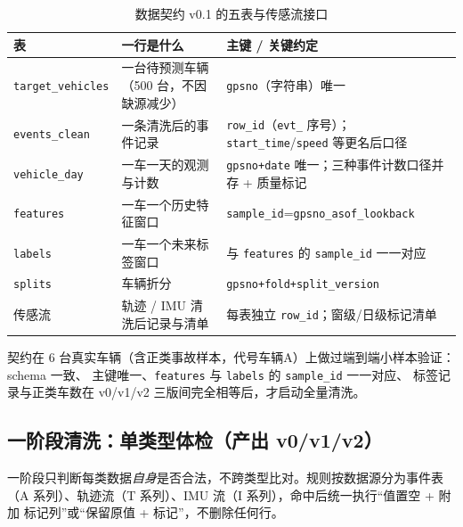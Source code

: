 \begin{table}[H]
\centering
\caption{数据契约 v0.1 的五表与传感流接口}
\label{tab:contract}
\small
\begin{tabularx}{\textwidth}{lLL}
\toprule
表 & 一行是什么 & 主键 / 关键约定 \\
\midrule
\texttt{target\_vehicles} & 一台待预测车辆（500 台，不因缺源减少） & \texttt{gpsno}（字符串）唯一 \\
\texttt{events\_clean} & 一条清洗后的事件记录 & \texttt{row\_id}（\texttt{evt\_} 序号）；\texttt{start\_time}/\texttt{speed} 等更名后口径 \\
\texttt{vehicle\_day} & 一车一天的观测与计数 & \texttt{gpsno+date} 唯一；三种事件计数口径并存 + 质量标记 \\
\texttt{features} & 一车一个历史特征窗口 & \texttt{sample\_id}=\texttt{gpsno\_asof\_lookback} \\
\texttt{labels} & 一车一个未来标签窗口 & 与 \texttt{features} 的 \texttt{sample\_id} 一一对应 \\
\texttt{splits} & 车辆折分 & \texttt{gpsno+fold+split\_version} \\
传感流 & 轨迹 / IMU 清洗后记录与清单 & 每表独立 \texttt{row\_id}；窗级/日级标记清单 \\
\bottomrule
\end{tabularx}
\end{table}

契约在 6 台真实车辆（含正类事故样本，代号车辆A）上做过端到端小样本验证：schema 一致、
主键唯一、\texttt{features} 与 \texttt{labels} 的 \texttt{sample\_id} 一一对应、
标签记录与正类车数在 v0/v1/v2 三版间完全相等后，才启动全量清洗。

\subsection{一阶段清洗：单类型体检（产出 v0/v1/v2）}

一阶段只判断每类数据\emph{自身}是否合法，不跨类型比对。规则按数据源分为事件表
（A 系列）、轨迹流（T 系列）、IMU 流（I 系列），命中后统一执行“值置空 + 附加
标记列”或“保留原值 + 标记”，不删除任何行。

